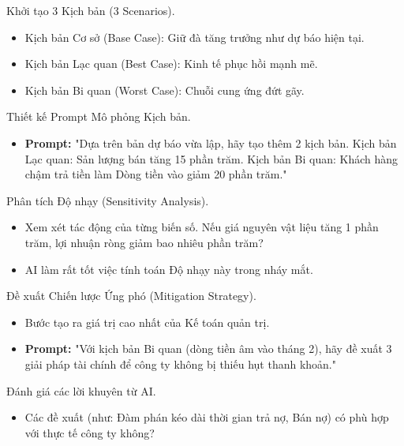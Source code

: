 \documentclass[aspectratio=169]{beamer}
\begin{document}
\begin{frame}{Khởi tạo 3 Kịch bản (3 Scenarios).}
    \begin{itemize}
        \item Kịch bản Cơ sở (Base Case): Giữ đà tăng trưởng như dự báo hiện tại.
        \item Kịch bản Lạc quan (Best Case): Kinh tế phục hồi mạnh mẽ.
        \item Kịch bản Bi quan (Worst Case): Chuỗi cung ứng đứt gãy.
    \end{itemize}
\end{frame}


\begin{frame}{Thiết kế Prompt Mô phỏng Kịch bản.}
    \begin{itemize}
        \item \textbf{Prompt:} "Dựa trên bản dự báo vừa lập, hãy tạo thêm 2 kịch bản. Kịch bản Lạc quan: Sản lượng bán tăng 15 phần trăm. Kịch bản Bi quan: Khách hàng chậm trả tiền làm Dòng tiền vào giảm 20 phần trăm."
    \end{itemize}
\end{frame}


\begin{frame}{Phân tích Độ nhạy (Sensitivity Analysis).}
    \begin{itemize}
        \item Xem xét tác động của từng biến số. Nếu giá nguyên vật liệu tăng 1 phần trăm, lợi nhuận ròng giảm bao nhiêu phần trăm?
        \item AI làm rất tốt việc tính toán Độ nhạy này trong nháy mắt.
    \end{itemize}
\end{frame}


\begin{frame}{Đề xuất Chiến lược Ứng phó (Mitigation Strategy).}
    \begin{itemize}
        \item Bước tạo ra giá trị cao nhất của Kế toán quản trị.
        \item \textbf{Prompt:} "Với kịch bản Bi quan (dòng tiền âm vào tháng 2), hãy đề xuất 3 giải pháp tài chính để công ty không bị thiếu hụt thanh khoản."
    \end{itemize}
\end{frame}


\begin{frame}{Đánh giá các lời khuyên từ AI.}
    \begin{itemize}
        \item Các đề xuất (như: Đàm phán kéo dài thời gian trả nợ, Bán nợ) có phù hợp với thực tế công ty không?
    \end{itemize}
\end{frame}
\end{document}
